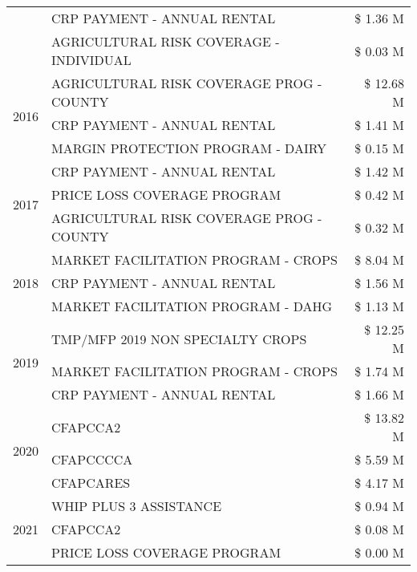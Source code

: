 \begin{tabular}{llr}
 & CRP PAYMENT - ANNUAL RENTAL & \$ 1.36 M \\
 & AGRICULTURAL RISK COVERAGE - INDIVIDUAL & \$ 0.03 M \\
\cline{1-3}
\multirow[t]{3}{*}{2016} & AGRICULTURAL RISK COVERAGE PROG - COUNTY & \$ 12.68 M \\
 & CRP PAYMENT - ANNUAL RENTAL & \$ 1.41 M \\
 & MARGIN PROTECTION PROGRAM - DAIRY & \$ 0.15 M \\
\cline{1-3}
\multirow[t]{3}{*}{2017} & CRP PAYMENT - ANNUAL RENTAL & \$ 1.42 M \\
 & PRICE LOSS COVERAGE PROGRAM & \$ 0.42 M \\
 & AGRICULTURAL RISK COVERAGE PROG - COUNTY & \$ 0.32 M \\
\cline{1-3}
\multirow[t]{3}{*}{2018} & MARKET FACILITATION PROGRAM - CROPS & \$ 8.04 M \\
 & CRP PAYMENT - ANNUAL RENTAL & \$ 1.56 M \\
 & MARKET FACILITATION PROGRAM - DAHG & \$ 1.13 M \\
\cline{1-3}
\multirow[t]{3}{*}{2019} & TMP/MFP 2019 NON SPECIALTY CROPS & \$ 12.25 M \\
 & MARKET FACILITATION PROGRAM - CROPS & \$ 1.74 M \\
 & CRP PAYMENT - ANNUAL RENTAL & \$ 1.66 M \\
\cline{1-3}
\multirow[t]{3}{*}{2020} & CFAPCCA2 & \$ 13.82 M \\
 & CFAPCCCCA & \$ 5.59 M \\
 & CFAPCARES & \$ 4.17 M \\
\cline{1-3}
\multirow[t]{3}{*}{2021} & WHIP PLUS 3 ASSISTANCE & \$ 0.94 M \\
 & CFAPCCA2 & \$ 0.08 M \\
 & PRICE LOSS COVERAGE PROGRAM & \$ 0.00 M \\
\cline{1-3}
\bottomrule
\end{tabular}
